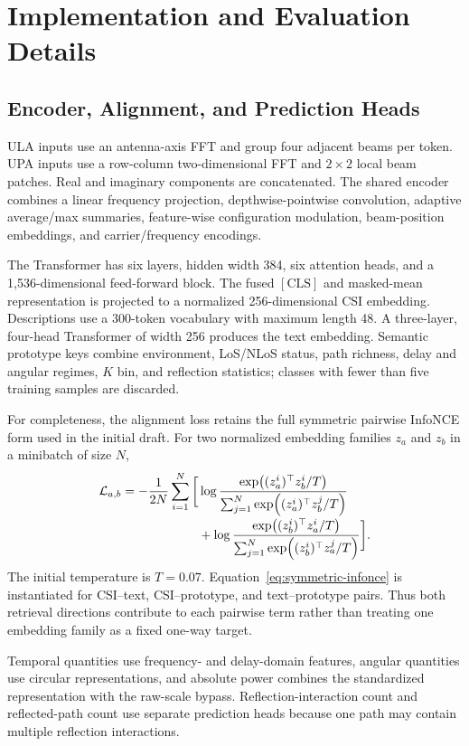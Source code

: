 \section{Implementation and Evaluation Details}

\subsection{Encoder, Alignment, and Prediction Heads}

ULA inputs use an antenna-axis FFT and group four adjacent beams per token. UPA inputs use a
row-column two-dimensional FFT and $2\times2$ local beam patches. Real and imaginary components
are concatenated. The shared encoder combines a linear frequency projection, depthwise-pointwise
convolution, adaptive average/max summaries, feature-wise configuration modulation, beam-position
embeddings, and carrier/frequency encodings.

The Transformer has six layers, hidden width 384, six attention heads, and a 1,536-dimensional
feed-forward block. The fused $[\mathrm{CLS}]$ and masked-mean representation is projected to a
normalized 256-dimensional CSI embedding. Descriptions use a 300-token vocabulary with maximum
length 48. A three-layer, four-head Transformer of width 256 produces the text embedding. Semantic
prototype keys combine environment, LoS/NLoS status, path richness, delay and angular regimes,
$K$ bin, and reflection statistics; classes with fewer than five training samples are discarded.

For completeness, the alignment loss retains the full symmetric pairwise InfoNCE form used in the
initial draft. For two normalized embedding families $z_a$ and $z_b$ in a minibatch of size $N$,
\begin{align}
\mathcal L_{a,b}=-\frac{1}{2N}\sum_{i=1}^{N}\bigg[&
\log\frac{\exp\!\left((z_a^i)^\top z_b^i/T\right)}
{\sum_{j=1}^{N}\exp\!\left((z_a^i)^\top z_b^j/T\right)} \notag\\[-2pt]
&+\log\frac{\exp\!\left((z_b^i)^\top z_a^i/T\right)}
{\sum_{j=1}^{N}\exp\!\left((z_b^i)^\top z_a^j/T\right)}\bigg].
\label{eq:symmetric-infonce}
\end{align}
The initial temperature is $T=0.07$. Equation~\ref{eq:symmetric-infonce} is instantiated for
CSI--text, CSI--prototype, and text--prototype pairs. Thus both retrieval directions contribute to
each pairwise term rather than treating one embedding family as a fixed one-way target.

Temporal quantities use frequency- and delay-domain features, angular quantities use circular
representations, and absolute power combines the standardized representation with the raw-scale
bypass. Reflection-interaction count and reflected-path count use separate prediction heads because
one path may contain multiple reflection interactions.

